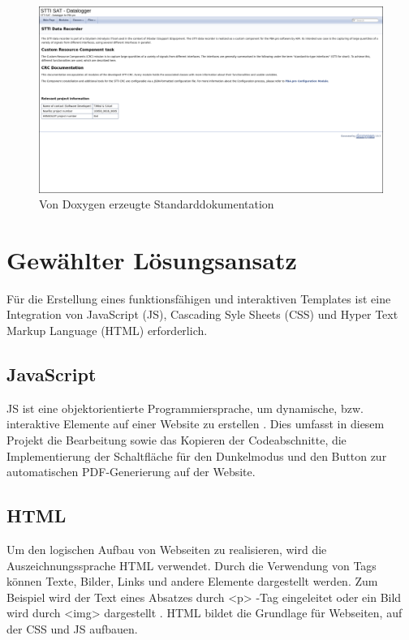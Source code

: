 \documentclass[11pt,a4paper]{report}
\begin{document}
\begin{figure}[H]
    \centering
     \includegraphics[width=\textwidth]{images/Doxygen_vorher.png}
    \caption{Von Doxygen erzeugte Standarddokumentation}
    \label{fig:doxygen-befor}
\end{figure}
\newpage

\restoregeometry
\section{Gewählter Lösungsansatz} \label{sec:time}
Für die Erstellung eines funktionsfähigen und interaktiven Templates ist eine Integration von JavaScript (JS), Cascading Syle Sheets (CSS) und Hyper Text Markup Language (HTML) 
erforderlich.

\subsection{JavaScript} \label{sec:JS}
JS ist eine objektorientierte Programmiersprache, um dynamische,  bzw. interaktive Elemente auf einer Website zu erstellen \cite{JS_Tutorial}. Dies umfasst in diesem Projekt die Bearbeitung sowie das Kopieren der Codeabschnitte, die Implementierung der Schaltfläche für den Dunkelmodus und den Button zur automatischen PDF-Generierung auf der Website.

\subsection{HTML} \label{sec:HTML}
Um den logischen Aufbau von Webseiten zu realisieren, wird die Auszeichnungssprache HTML verwendet. Durch die Verwendung von Tags können Texte, Bilder, Links und andere Elemente dargestellt werden. Zum Beispiel wird der Text eines Absatzes durch \glqq <p> \grqq{}-Tag eingeleitet oder ein Bild wird durch \glqq <img> \grqq{} dargestellt \cite{HTML_Tutorial}. HTML bildet die Grundlage für Webseiten, auf der CSS und JS aufbauen.
\end{document}
